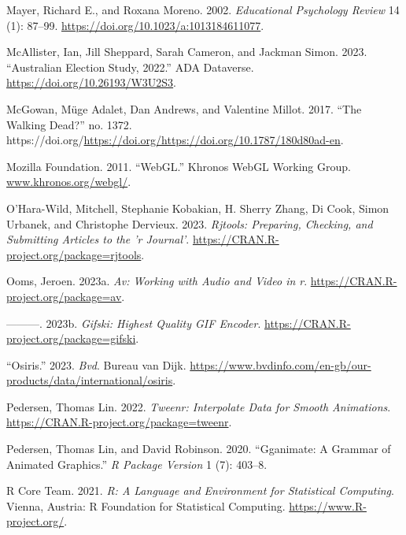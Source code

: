 \begin{CSLReferences}{1}{0}
\leavevmode{}%
Mayer, Richard E., and Roxana Moreno. 2002. \emph{Educational Psychology Review} 14 (1): 87--99. \url{https://doi.org/10.1023/a:1013184611077}.

\leavevmode{}%
McAllister, Ian, Jill Sheppard, Sarah Cameron, and Jackman Simon. 2023. {``Australian Election Study, 2022.''} ADA Dataverse. \url{https://doi.org/10.26193/W3U2S3}.

\leavevmode{}%
McGowan, Müge Adalet, Dan Andrews, and Valentine Millot. 2017. {``The Walking Dead?''} no. 1372. https://doi.org/\url{https://doi.org/https://doi.org/10.1787/180d80ad-en}.

\leavevmode{}%
Mozilla Foundation. 2011. {``WebGL.''} Khronos WebGL Working Group. \href{https://www.khronos.org/webgl/}{www.khronos.org/webgl/}.

\leavevmode{}%
O'Hara-Wild, Mitchell, Stephanie Kobakian, H. Sherry Zhang, Di Cook, Simon Urbanek, and Christophe Dervieux. 2023. \emph{Rjtools: Preparing, Checking, and Submitting Articles to the 'r Journal'}. \url{https://CRAN.R-project.org/package=rjtools}.

\leavevmode{}%
Ooms, Jeroen. 2023a. \emph{Av: Working with Audio and Video in r}. \url{https://CRAN.R-project.org/package=av}.

\leavevmode{}%
---------. 2023b. \emph{Gifski: Highest Quality GIF Encoder}. \url{https://CRAN.R-project.org/package=gifski}.

\leavevmode{}%
{``Osiris.''} 2023. \emph{Bvd}. Bureau van Dijk. \url{https://www.bvdinfo.com/en-gb/our-products/data/international/osiris}.

\leavevmode{}%
Pedersen, Thomas Lin. 2022. \emph{Tweenr: Interpolate Data for Smooth Animations}. \url{https://CRAN.R-project.org/package=tweenr}.

\leavevmode{}%
Pedersen, Thomas Lin, and David Robinson. 2020. {``Gganimate: A Grammar of Animated Graphics.''} \emph{R Package Version} 1 (7): 403--8.

\leavevmode{}%
R Core Team. 2021. \emph{R: A Language and Environment for Statistical Computing}. Vienna, Austria: R Foundation for Statistical Computing. \url{https://www.R-project.org/}.


\end{CSLReferences}
